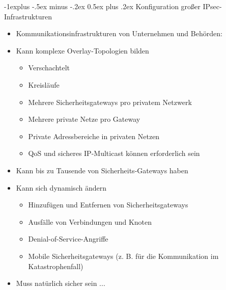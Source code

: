 \documentclass[a4paper]{article}
\makeatletter
\renewcommand{\subsection}{\@startsection{subsection}{2}{0mm}%
 {-1explus -.5ex minus -.2ex}%
 {0.5ex plus .2ex}%
 {\normalfont\normalsize\bfseries}}
\makeatother
\begin{document}
\begin{multicols}{3}
    \subsection{Konfiguration großer
        IPsec-Infrastrukturen}

    \begin{itemize}
        \item
              Kommunikationsinfrastrukturen von Unternehmen und Behörden:
        \item
              Kann komplexe Overlay-Topologien bilden

              \begin{itemize}
                  \item
                        Verschachtelt
                  \item
                        Kreisläufe
                  \item
                        Mehrere Sicherheitsgateways pro privatem Netzwerk
                  \item
                        Mehrere private Netze pro Gateway
                  \item
                        Private Adressbereiche in privaten Netzen
                  \item
                        QoS und sicheres IP-Multicast können erforderlich sein
              \end{itemize}
        \item
              Kann bis zu Tausende von Sicherheits-Gateways haben
        \item
              Kann sich dynamisch ändern

              \begin{itemize}
                  \item
                        Hinzufügen und Entfernen von Sicherheitsgateways
                  \item
                        Ausfälle von Verbindungen und Knoten
                  \item
                        Denial-of-Service-Angriffe
                  \item
                        Mobile Sicherheitsgateways (z. B. für die Kommunikation im
                        Katastrophenfall)
              \end{itemize}
        \item
              Muss natürlich sicher sein ...
    \end{itemize}



\end{multicols}
\end{document}
